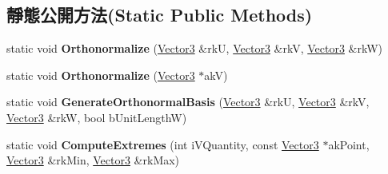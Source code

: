 \subsection*{靜態公開方法(Static Public Methods)}
\begin{DoxyCompactItemize}
\item 
static void {\bfseries Orthonormalize} (\hyperlink{class_magnum_1_1_vector3}{Vector3} \&rkU, \hyperlink{class_magnum_1_1_vector3}{Vector3} \&rkV, \hyperlink{class_magnum_1_1_vector3}{Vector3} \&rkW)\hypertarget{class_magnum_1_1_vector3_a2f792fd0d649347c7e493e528ee951ad}{}\label{class_magnum_1_1_vector3_a2f792fd0d649347c7e493e528ee951ad}

\item 
static void {\bfseries Orthonormalize} (\hyperlink{class_magnum_1_1_vector3}{Vector3} $\ast$akV)\hypertarget{class_magnum_1_1_vector3_a357d259609192b66951443d44cf7465b}{}\label{class_magnum_1_1_vector3_a357d259609192b66951443d44cf7465b}

\item 
static void {\bfseries Generate\+Orthonormal\+Basis} (\hyperlink{class_magnum_1_1_vector3}{Vector3} \&rkU, \hyperlink{class_magnum_1_1_vector3}{Vector3} \&rkV, \hyperlink{class_magnum_1_1_vector3}{Vector3} \&rkW, bool b\+Unit\+LengthW)\hypertarget{class_magnum_1_1_vector3_a96048a1ede33a929b0d3d2dc88691a02}{}\label{class_magnum_1_1_vector3_a96048a1ede33a929b0d3d2dc88691a02}

\item 
static void {\bfseries Compute\+Extremes} (int i\+V\+Quantity, const \hyperlink{class_magnum_1_1_vector3}{Vector3} $\ast$ak\+Point, \hyperlink{class_magnum_1_1_vector3}{Vector3} \&rk\+Min, \hyperlink{class_magnum_1_1_vector3}{Vector3} \&rk\+Max)\hypertarget{class_magnum_1_1_vector3_a67053a6081dde2abc53c34a7a29d968b}{}\label{class_magnum_1_1_vector3_a67053a6081dde2abc53c34a7a29d968b}

\end{DoxyCompactItemize}
